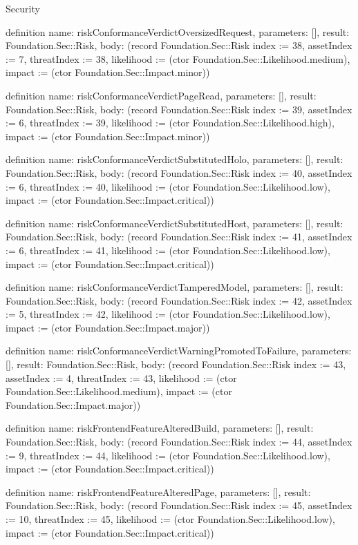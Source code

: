 \begin{lexlean}{Security}
\begin{semanticmodule}
definition{
  name: riskConformanceVerdictOversizedRequest,
  parameters: [],
  result: Foundation.Sec::Risk,
  body: (record Foundation.Sec::Risk {index := 38, assetIndex := 7, threatIndex := 38, likelihood := (ctor Foundation.Sec::Likelihood.medium), impact := (ctor Foundation.Sec::Impact.minor)})
}

definition{
  name: riskConformanceVerdictPageRead,
  parameters: [],
  result: Foundation.Sec::Risk,
  body: (record Foundation.Sec::Risk {index := 39, assetIndex := 6, threatIndex := 39, likelihood := (ctor Foundation.Sec::Likelihood.high), impact := (ctor Foundation.Sec::Impact.minor)})
}

definition{
  name: riskConformanceVerdictSubstitutedHolo,
  parameters: [],
  result: Foundation.Sec::Risk,
  body: (record Foundation.Sec::Risk {index := 40, assetIndex := 6, threatIndex := 40, likelihood := (ctor Foundation.Sec::Likelihood.low), impact := (ctor Foundation.Sec::Impact.critical)})
}

definition{
  name: riskConformanceVerdictSubstitutedHost,
  parameters: [],
  result: Foundation.Sec::Risk,
  body: (record Foundation.Sec::Risk {index := 41, assetIndex := 6, threatIndex := 41, likelihood := (ctor Foundation.Sec::Likelihood.low), impact := (ctor Foundation.Sec::Impact.critical)})
}

definition{
  name: riskConformanceVerdictTamperedModel,
  parameters: [],
  result: Foundation.Sec::Risk,
  body: (record Foundation.Sec::Risk {index := 42, assetIndex := 5, threatIndex := 42, likelihood := (ctor Foundation.Sec::Likelihood.low), impact := (ctor Foundation.Sec::Impact.major)})
}

definition{
  name: riskConformanceVerdictWarningPromotedToFailure,
  parameters: [],
  result: Foundation.Sec::Risk,
  body: (record Foundation.Sec::Risk {index := 43, assetIndex := 4, threatIndex := 43, likelihood := (ctor Foundation.Sec::Likelihood.medium), impact := (ctor Foundation.Sec::Impact.major)})
}

definition{
  name: riskFrontendFeatureAlteredBuild,
  parameters: [],
  result: Foundation.Sec::Risk,
  body: (record Foundation.Sec::Risk {index := 44, assetIndex := 9, threatIndex := 44, likelihood := (ctor Foundation.Sec::Likelihood.low), impact := (ctor Foundation.Sec::Impact.critical)})
}

definition{
  name: riskFrontendFeatureAlteredPage,
  parameters: [],
  result: Foundation.Sec::Risk,
  body: (record Foundation.Sec::Risk {index := 45, assetIndex := 10, threatIndex := 45, likelihood := (ctor Foundation.Sec::Likelihood.low), impact := (ctor Foundation.Sec::Impact.critical)})
}


\end{semanticmodule}
\end{lexlean}

